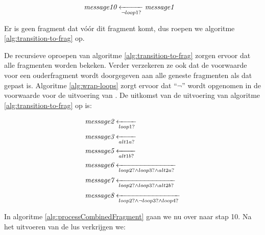 \begin{align*}
	&\transitionentry[\fragmessage{message1}]{\lnot \fragcond{loop1}}{\fragmessage{message10}}
\end{align*}

Er is geen fragment dat v\'o\'or dit fragment komt, dus roepen we algoritme \ref{alg:transition-to-frag} op.

De recursieve oproepen van algoritme \ref{alg:transition-to-frag} zorgen ervoor dat alle fragmenten worden bekeken. Verder verzekeren ze ook dat de voorwaarde voor een ouderfragment wordt doorgegeven aan alle geneste fragmenten als dat gepast is. Algoritme \ref{alg:wrap-loops} zorgt ervoor dat ``$\lnot$'' wordt opgenomen in de voorwaarde voor de uitvoering van . De uitkomst van de uitvoering van algoritme \ref{alg:transition-to-frag} op  is:

\begin{align*}
	&\transitionentry{\fragcond{loop1}}{\fragmessage{message2}} \\
	&\transitionentry{\fragcond{alt1a}}{\fragmessage{message3}} \\
	&\transitionentry{\fragcond{alt1b}}{\fragmessage{message5}} \\
	&\transitionentry{\fragcond{loop2} \land \fragcond{loop3} \land \fragcond{alt2a}}{\fragmessage{message6}} \\
	&\transitionentry{\fragcond{loop2} \land \fragcond{loop3} \land \fragcond{alt2b}}{\fragmessage{message7}} \\
	&\transitionentry{\fragcond{loop2} \land \lnot \fragcond{loop3} \land \fragcond{loop4}}{\fragmessage{message8}}
\end{align*}

In algoritme \ref{alg:processCombinedFragment} gaan we nu over naar stap 10. Na het uitvoeren van de lus verkrijgen we:

